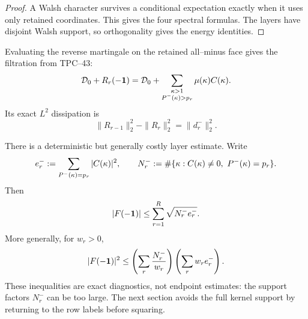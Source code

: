 \begin{proof}
A Walsh character survives a conditional expectation exactly when it
uses only retained coordinates.  This gives the four spectral formulas.
The layers have disjoint Walsh support, so orthogonality gives the energy
identities.
\end{proof}

Evaluating the reverse martingale on the retained all--minus face gives
the filtration from TPC--43:
\begin{equation}
 \mathcal D_0+R_r(-\mathbf 1)
 =\mathcal D_0+
  \sum_{\substack{\kappa>1\\P^{-}(\kappa)>p_r}}
  \mu(\kappa)C(\kappa).
 \label{eq:tpc44-rough-filtration}
\end{equation}
Its exact \(L^2\) dissipation is
\begin{equation}
 \|R_{r-1}\|_2^2-\|R_r\|_2^2=\|d_r^-\|_2^2.
 \label{eq:tpc44-reverse-dissipation}
\end{equation}

There is a deterministic but generally costly layer estimate.  Write
\begin{equation}
 e_r^-:=\sum_{P^{-}(\kappa)=p_r}|C(\kappa)|^2,
 \qquad
 N_r^-:=\#\{\kappa:C(\kappa)\ne0,\ P^{-}(\kappa)=p_r\}.
 \label{eq:tpc44-layer-count-energy}
\end{equation}
Then
\begin{equation}
 |F(-\mathbf 1)|
 \le\sum_{r=1}^{R}\sqrt{N_r^-e_r^-}.
 \label{eq:tpc44-layer-Cauchy}
\end{equation}
More generally, for \(w_r>0\),
\begin{equation}
 |F(-\mathbf 1)|^2
 \le
 \left(\sum_r\frac{N_r^-}{w_r}\right)
 \left(\sum_rw_re_r^-\right).
 \label{eq:tpc44-weighted-layer-Cauchy}
\end{equation}
These inequalities are exact diagnostics, not endpoint estimates: the
support factors \(N_r^-\) can be too large.  The next section avoids the
full kernel support by returning to the row labels before squaring.
